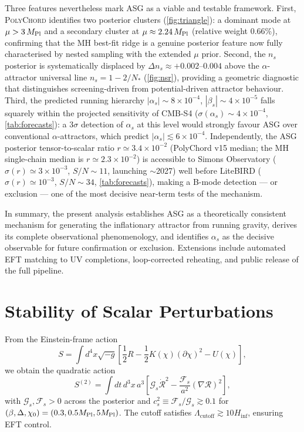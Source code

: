 \documentclass[11pt,a4paper]{article}
\begin{document}
Three features nevertheless mark ASG as a viable and testable framework. First, \textsc{PolyChord} identifies two posterior clusters (\cref{fig:triangle}): a dominant mode at $\mu>3\,M_{\rm Pl}$ and a secondary cluster at $\mu\approx2.24\,M_{\rm Pl}$ (relative weight 0.66\%), confirming that the MH best-fit ridge is a genuine posterior feature now fully characterised by nested sampling with the extended $\mu$ prior. Second, the $n_s$ posterior is systematically displaced by $\Delta n_s\approx+0.002$--$0.004$ above the $\alpha$-attractor universal line $n_s=1-2/N_*$ (\cref{fig:nsr}), providing a geometric diagnostic that distinguishes screening-driven from potential-driven attractor behaviour. Third, the predicted running hierarchy $|\alpha_s|\sim8\times10^{-4}$, $|\beta_s|\sim4\times10^{-5}$ falls squarely within the projected sensitivity of CMB-S4 ($\sigma(\alpha_s)\sim4\times10^{-4}$, \cref{tab:forecasts}): a $3\sigma$ detection of $\alpha_s$ at this level would strongly favour ASG over conventional $\alpha$-attractors, which predict $|\alpha_s|\lesssim6\times10^{-4}$. Independently, the ASG posterior tensor-to-scalar ratio $r\simeq3.4\times10^{-2}$ (PolyChord v15 median; the MH single-chain median is $r\simeq2.3\times10^{-2}$) is accessible to Simons Observatory ($\sigma(r)\simeq3\times10^{-3}$, $S/N\sim11$, launching $\sim$2027) well before LiteBIRD ($\sigma(r)\simeq10^{-3}$, $S/N\sim34$, \cref{tab:forecasts}), making a B-mode detection --- or exclusion --- one of the most decisive near-term tests of the mechanism.

In summary, the present analysis establishes ASG as a theoretically consistent mechanism for generating the inflationary attractor from running gravity, derives its complete observational phenomenology, and identifies $\alpha_s$ as the decisive observable for future confirmation or exclusion. Extensions include automated EFT matching to UV completions, loop-corrected reheating, and public release of the full pipeline.

\section{Stability of Scalar Perturbations}
\label{sec:stability}
From the Einstein-frame action
\begin{equation}
S=\int d^{4}x\sqrt{-g}\left[\frac{1}{2}R-\frac{1}{2}K(\chi)(\partial\chi)^{2}-U(\chi)\right],
\end{equation}
we obtain the quadratic action
\begin{equation}
S^{(2)}=\int dt\,d^{3}x\,a^{3}\left[\mathcal{G}_{s}\dot{\mathcal{R}}^{2}-\frac{\mathcal{F}_{s}}{a^{2}}(\nabla\mathcal{R})^{2}\right],
\end{equation}
with $\mathcal{G}_{s},\mathcal{F}_{s}>0$ across the posterior and $c_{s}^{2}\equiv\mathcal{F}_{s}/\mathcal{G}_{s}\gtrsim0.1$ for $(\beta,\Delta,\chi_{0})=(0.3,0.5M_{\rm Pl},5M_{\rm Pl})$. The cutoff satisfies $\Lambda_{\text{cutoff}}\gtrsim10H_{\text{inf}}$, ensuring EFT control.
\end{document}
